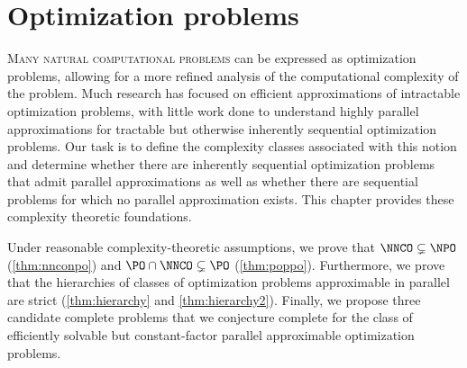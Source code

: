 \newcommand{\cl}{\operatorname{cl}}

\chapter{Optimization problems}
\label{chp:optimization}

%
%
%
\lettrine[loversize=0.125, lhang=0.05, findent=0.2em, nindent=0em]{M}{any natural computational problems} can be expressed as optimization problems, allowing for a more refined analysis of the computational complexity of the problem.
%
%
%
Much research has focused on efficient approximations of intractable optimization problems, with little work done to understand highly parallel approximations for tractable but otherwise inherently sequential optimization problems.
%
%
%
Our task is to define the complexity classes associated with this notion and determine whether there are inherently sequential optimization problems that admit parallel approximations as well as whether there are sequential problems for which no parallel approximation exists.
%
%
%
This chapter provides these complexity theoretic foundations.

%
%
%
%
Under reasonable complexity-theoretic assumptions, we prove that $\NNCO \subsetneq \NPO$ (\autoref{thm:nnconpo}) and $\PO \cap \NNCO \subsetneq \PO$ (\autoref{thm:poppo}).
Furthermore, we prove that the hierarchies of classes of optimization problems approximable in parallel are strict (\autoref{thm:hierarchy} and \autoref{thm:hierarchy2}).
Finally, we propose three candidate complete problems that we conjecture complete for the class of efficiently solvable but constant-factor parallel approximable optimization problems.

